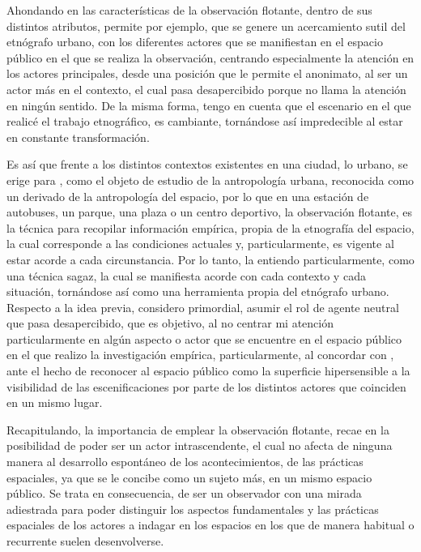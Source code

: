 \documentclass[
  spanish,
  11pt,
  a4paper,
]{scrbook}
\begin{document}
Ahondando en las características de la observación flotante, dentro de
sus distintos atributos, permite por ejemplo, que se genere un
acercamiento sutil del etnógrafo urbano, con los diferentes actores que
se manifiestan en el espacio público en el que se realiza la
observación, centrando especialmente la atención en los actores
principales, desde una posición que le permite el anonimato, al ser un
actor más en el contexto, el cual pasa desapercibido porque no llama la
atención en ningún sentido. De la misma forma, tengo en cuenta que el
escenario en el que realicé el trabajo etnográfico, es cambiante,
tornándose así impredecible al estar en constante transformación.

Es así que frente a los distintos contextos existentes en una ciudad, lo
urbano, se erige para \textcite{Delgado2002}, como el objeto de estudio
de la antropología urbana, reconocida como un derivado de la
antropología del espacio, por lo que en una estación de autobuses, un
parque, una plaza o un centro deportivo, la observación flotante, es la
técnica para recopilar información empírica, propia de la etnografía del
espacio, la cual corresponde a las condiciones actuales y,
particularmente, es vigente al estar acorde a cada circunstancia. Por lo
tanto, la entiendo particularmente, como una técnica sagaz, la cual se
manifiesta acorde con cada contexto y cada situación, tornándose así
como una herramienta propia del etnógrafo urbano. Respecto a la idea
previa, considero primordial, asumir el rol de agente neutral que pasa
desapercibido, que es objetivo, al no centrar mi atención
particularmente en algún aspecto o actor que se encuentre en el espacio
público en el que realizo la investigación empírica, particularmente, al
concordar con \textcite{Delgado2002}, ante el hecho de reconocer al
espacio público como la superficie hipersensible a la visibilidad de las
escenificaciones por parte de los distintos actores que coinciden en un
mismo lugar.

Recapitulando, la importancia de emplear la observación flotante, recae
en la posibilidad de poder ser un actor intrascendente, el cual no
afecta de ninguna manera al desarrollo espontáneo de los
acontecimientos, de las prácticas espaciales, ya que se le concibe como
un sujeto más, en un mismo espacio público. Se trata en consecuencia, de
ser un observador con una mirada adiestrada para poder distinguir los
aspectos fundamentales y las prácticas espaciales de los actores a
indagar en los espacios en los que de manera habitual o recurrente
suelen desenvolverse.
\end{document}
